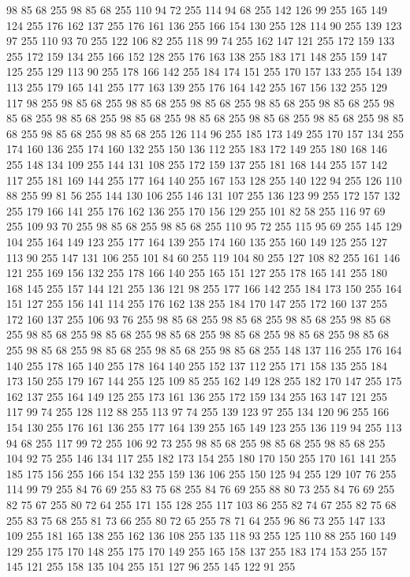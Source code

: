 98 85 68 255 98 85 68 255 110 94 72 255 114 94 68 255 142 126 99 255 165 149 124 255 176 162 137 255 176 161 136 255 166 154 130 255 128 114 90 255 139 123 97 255 110 93 70 255 122 106 82 255 118 99 74 255 162 147 121 255 172 159 133 255 172 159 134 255 166 152 128 255 176 163 138 255 183 171 148 255 159 147 125 255 129 113 90 255 178 166 142 255 184 174 151 255 170 157 133 255 154 139 113 255 179 165 141 255 177 163 139 255 176 164 142 255 167 156 132 255 129 117 98 255 98 85 68 255 98 85 68 255 98 85 68 255 98 85 68 255 98 85 68 255 98 85 68 255 98 85 68 255 98 85 68 255 98 85 68 255 98 85 68 255 98 85 68 255 98 85 68 255 98 85 68 255 98 85 68 255 126 114 96 255 185 173 149 255 170 157 134 255 174 160 136 255 174 160 132 255 150 136 112 255 183 172 149 255 180 168 146 255 148 134 109 255 144 131 108 255 172 159 137 255 181 168 144 255 157 142 117 255 181 169 144 255 177 164 140 255 167 153 128 255 140 122 94 255 126 110 88 255 99 81 56 255
144 130 106 255 146 131 107 255 136 123 99 255 172 157 132 255 179 166 141 255 176 162 136 255 170 156 129 255 101 82 58 255 116 97 69 255 109 93 70 255 98 85 68 255 98 85 68 255 110 95 72 255 115 95 69 255 145 129 104 255 164 149 123 255 177 164 139 255 174 160 135 255 160 149 125 255 127 113 90 255 147 131 106 255 101 84 60 255 119 104 80 255 127 108 82 255 161 146 121 255 169 156 132 255 178 166 140 255 165 151 127 255 178 165 141 255 180 168 145 255 157 144 121 255 136 121 98 255 177 166 142 255 184 173 150 255 164 151 127 255 156 141 114 255 176 162 138 255 184 170 147 255 172 160 137 255 172 160 137 255 106 93 76 255 98 85 68 255 98 85 68 255 98 85 68 255 98 85 68 255 98 85 68 255 98 85 68 255 98 85 68 255 98 85 68 255 98 85 68 255 98 85 68 255 98 85 68 255 98 85 68 255 98 85 68 255 98 85 68 255 148 137 116 255 176 164 140 255 178 165 140 255 178 164 140 255 152 137 112 255 171 158 135 255 184 173 150 255 179 167 144 255 125 109 85 255
162 149 128 255 182 170 147 255 175 162 137 255 164 149 125 255 173 161 136 255 172 159 134 255 163 147 121 255 117 99 74 255 128 112 88 255 113 97 74 255 139 123 97 255 134 120 96 255 166 154 130 255 176 161 136 255 177 164 139 255 165 149 123 255 136 119 94 255 113 94 68 255 117 99 72 255 106 92 73 255 98 85 68 255 98 85 68 255 98 85 68 255 104 92 75 255 146 134 117 255 182 173 154 255 180 170 150 255 170 161 141 255 185 175 156 255 166 154 132 255 159 136 106 255 150 125 94 255 129 107 76 255 114 99 79 255 84 76 69 255 83 75 68 255 84 76 69 255 88 80 73 255 84 76 69 255 82 75 67 255 80 72 64 255 171 155 128 255 117 103 86 255 82 74 67 255 82 75 68 255 83 75 68 255 81 73 66 255 80 72 65 255 78 71 64 255 96 86 73 255 147 133 109 255 181 165 138 255 162 136 108 255 135 118 93 255 125 110 88 255 160 149 129 255 175 170 148 255 175 170 149 255 165 158 137 255 183 174 153 255 157 145 121 255 158 135 104 255 151 127 96 255 145 122 91 255
